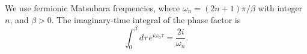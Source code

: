 \documentclass{article}
\begin{document}
We use fermionic Matsubara frequencies, where $\omega_n = (2n+1)\pi/\beta$ with integer $n$, and $\beta>0$.
The imaginary-time integral of the phase factor is
\begin{equation}
\int_0^{\beta} d\tau\, e^{i\omega_n\tau} = \frac{2i}{\omega_n} .
\label{eq:mats}
\end{equation}
\end{document}
